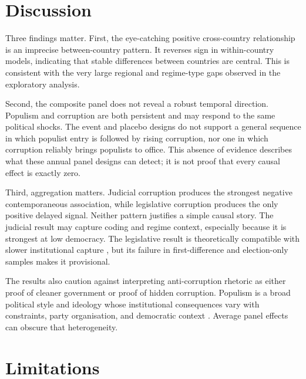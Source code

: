 

\section{Discussion}

Three findings matter. First, the eye-catching positive cross-country relationship is an imprecise
between-country pattern. It reverses sign in within-country models, indicating that stable differences
between countries are central. This is consistent with the very large regional and regime-type gaps
observed in the exploratory analysis.

Second, the composite panel does not reveal a robust temporal direction. Populism and corruption are
both persistent and may respond to the same political shocks. The event and placebo designs do not
support a general sequence in which populist entry is followed by rising corruption, nor one in which
corruption reliably brings populists to office. This absence of evidence describes what these annual
panel designs can detect; it is not proof that every causal effect is exactly zero.

Third, aggregation matters. Judicial corruption produces the strongest negative contemporaneous
association, while legislative corruption produces the only positive delayed signal. Neither pattern
justifies a simple causal story. The judicial result may capture coding and regime context, especially
because it is strongest at low democracy. The legislative result is theoretically compatible with
slower institutional capture \citep{chesterley2018,batory2016}, but its failure in first-difference and
election-only samples makes it provisional.

The results also caution against interpreting anti-corruption rhetoric as either proof of cleaner
government or proof of hidden corruption. Populism is a broad political style and ideology whose
institutional consequences vary with constraints, party organisation, and democratic context
\citep{guriev2022,huber2017}. Average panel effects can obscure that heterogeneity.

\section{Limitations}

